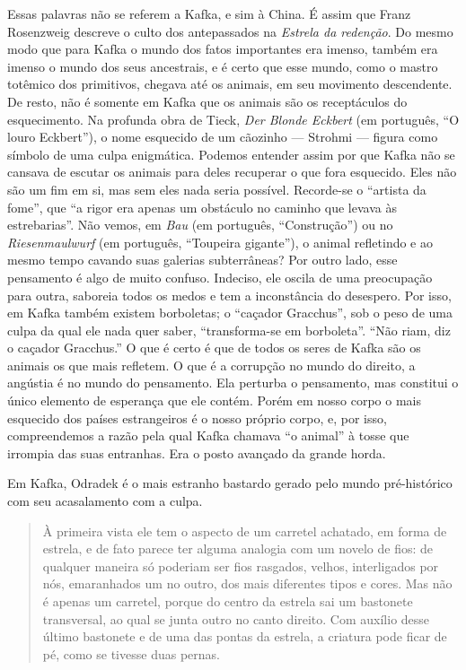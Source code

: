 Essas palavras não se referem a
Kafka, e sim à China. É assim que Franz Rosenzweig descreve o culto dos
antepassados na \textit{Estrela da redenção}. Do mesmo modo que para Kafka o
mundo dos fatos importantes era imenso, também era imenso o mundo dos
seus ancestrais, e é certo que esse mundo, como o mastro totêmico dos
primitivos, chegava até os animais, em seu movimento descendente. De
resto, não é somente em Kafka que os animais são os receptáculos do
esquecimento. Na profunda obra de Tieck, \textit{Der Blonde Eckbert} (em português, ``O louro Eckbert''), o nome esquecido de um cãozinho --- Strohmi --- figura como
símbolo de uma culpa enigmática. Podemos entender assim por que Kafka
não se cansava de escutar os animais para deles recuperar o que fora
esquecido. Eles não são um fim em si, mas sem eles nada seria possível.
Recorde-se o ``artista da fome'', que ``a rigor era apenas um obstáculo
no caminho que levava às estrebarias''. Não vemos, em \textit{Bau}
(em português, ``Construção'') ou no \textit{Riesenmaulwurf} (em português, ``Toupeira gigante''), o animal
refletindo e ao mesmo tempo cavando suas galerias subterrâneas? Por
outro lado, esse pensamento é algo de muito confuso. Indeciso, ele
oscila de uma preocupação para outra, saboreia todos os medos e tem a
inconstância do desespero. Por isso, em Kafka também existem borboletas;
o ``caçador Gracchus'', sob o peso de uma culpa da qual ele nada quer
saber, ``transforma-se em borboleta''. ``Não riam, diz o caçador
Gracchus.'' O que é certo é que de todos os seres de Kafka são os
animais os que mais refletem. O que é a corrupção no mundo do direito, a
angústia é no mundo do pensamento. Ela perturba o pensamento, mas
constitui o único elemento de esperança que ele contém. Porém em nosso
corpo o mais esquecido dos países estrangeiros é o nosso próprio corpo,
e, por isso, compreendemos a razão pela qual Kafka chamava ``o animal''
à tosse que irrompia das suas entranhas. Era o posto avançado da grande
horda.

Em Kafka, Odradek é o mais estranho bastardo gerado pelo mundo
pré-histórico com seu acasalamento com a culpa. 

\begin{quote}
À primeira vista ele
tem o aspecto de um carretel achatado, em forma de estrela, e de fato
parece ter alguma analogia com um novelo de fios: de qualquer maneira só
poderiam ser fios rasgados, velhos, interligados por nós, emaranhados um
no outro, dos mais diferentes tipos e cores. Mas não é apenas um
carretel, porque do centro da estrela sai um bastonete transversal, ao
qual se junta outro no canto direito. Com auxílio desse último bastonete
e de uma das pontas da estrela, a criatura pode ficar de pé, como se
tivesse duas pernas.
\end{quote}

